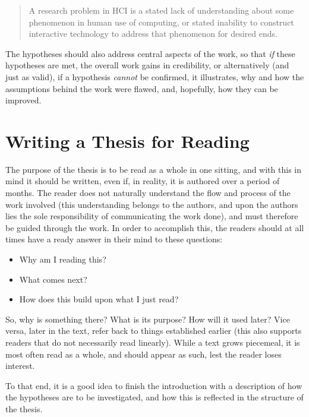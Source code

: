 \begin{quote}
  A research problem in HCI is a stated lack of understanding about some
  phenomenon in human use of computing, or stated inability to construct
  interactive technology to address that phenomenon for desired
  ends.~\cite[Def.\ 1]{Oulasvirta2016:POT2CCOHFICS2016}
\end{quote}


The hypotheses should also address central aspects of the work, so that
\emph{if} these hypotheses are met, the overall work gains in credibility,
or alternatively (and just as valid), if a hypothesis \emph{cannot} be
confirmed, it illustrates, why and how the assumptions behind the work were
flawed, and, hopefully, how they can be improved.

\section{Writing a Thesis for Reading}
\label{sec:writ-thes-read}

The purpose of the thesis is to be read as a whole in one sitting, and with
this in mind it should be written, even if, in reality, it is authored over
a period of months.  The reader does not naturally understand the flow and
process of the work involved (this understanding belongs to the authors, and
upon the authors lies the sole responsibility of communicating the work
done), and must therefore be guided through the work.  In order to
accomplish this, the readers should at all times have a ready answer in
their mind to these questions:

\begin{itemize}
\item Why am I reading this?
\item What comes next?
\item How does this build upon what I just read?
\end{itemize}

So, why is something there? What is its purpose? How will it used later?
Vice versa, later in the text, refer back to things established earlier
(this also supports readers that do not necessarily read linearly). While a
text grows piecemeal, it is most often read as a whole, and should appear as
such, lest the reader loses interest.

To that end, it is a good idea to finish the introduction with a description
of how the hypotheses are to be investigated, and how this is reflected in
the structure of the thesis.

